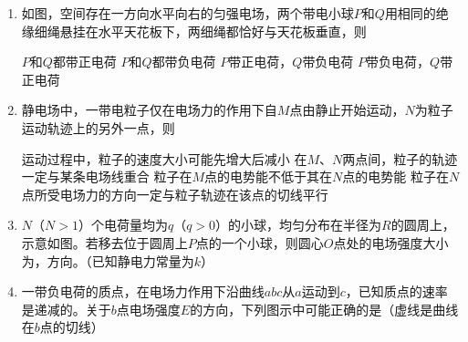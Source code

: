 
\begin{enumerate}[leftmargin=0em]
\renewcommand{\labelenumi}{\arabic{enumi}.}
\item
{}
如图，空间存在一方向水平向右的匀强电场，两个带电小球$ P $和$ Q $用相同的绝缘细绳悬挂在水平天花板下，两细绳都恰好与天花板垂直，则  
\begin{figure}[h!]
\centering

\end{figure}

\fourchoices
{$ P $和$ Q $都带正电荷}
{$ P $和$ Q $都带负电荷}
{$ P $带正电荷，$ Q $带负电荷}
{$ P $带负电荷，$ Q $带正电荷}


\item 
{}
静电场中，一带电粒子仅在电场力的作用下自$ M $点由静止开始运动，$ N $为粒子运动轨迹上的另外一点，则  



\fourchoices
{运动过程中，粒子的速度大小可能先增大后减小}
{在$ M $、$ N $两点间，粒子的轨迹一定与某条电场线重合}
{粒子在$ M $点的电势能不低于其在$ N $点的电势能}
{粒子在$ N $点所受电场力的方向一定与粒子轨迹在该点的切线平行}





\item
{}
$ N $（$ N > 1 $）个电荷量均为$ q $（$ q > 0 $）的小球，均匀分布在半径为$ R $的圆周上，示意如图。若移去位于圆周上$ P $点的一个小球，则圆心$ O $点处的电场强度大小为，方向。（已知静电力常量为$ k $）
\begin{figure}[h!]
\centering

\end{figure}

\newpage
\item
{}
一带负电荷的质点，在电场力作用下沿曲线$ abc $从$ a $运动到$ c $，已知质点的速率是递减的。关于$ b $点电场强度$ E $的方向，下列图示中可能正确的是（虚线是曲线在$ b $点的切线）  


\fourchoices
{}
{}
{}
{}






\end{enumerate}
